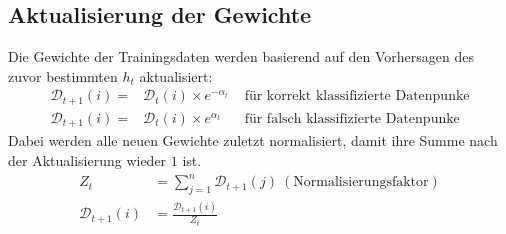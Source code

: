 \documentclass[11pt,a4paper,oneside]{scrartcl}
\begin{document}
\subsection*{Aktualisierung der Gewichte}
Die Gewichte der Trainingsdaten werden basierend auf den Vorhersagen des zuvor bestimmten $h_t$ aktualisiert:
\begin{align*}
    \mathcal{D}_{t+1}(i) = & \mathcal{D}_{t}(i) \times e^{-\alpha_t} & \text{ für korrekt klassifizierte Datenpunke} \\
    \mathcal{D}_{t+1}(i) = & \mathcal{D}_{t}(i) \times e^{\alpha_t}  & \text{ für falsch klassifizierte Datenpunke}
\end{align*}
Dabei werden alle neuen Gewichte zuletzt normalisiert, damit ihre Summe nach der Aktualisierung wieder $1$ ist.
\begin{align*}
    Z_t                  & =\sum_{j=1}^n\mathcal{D}_{t+1}(j)~(\text{Normalisierungsfaktor}) \\
    \mathcal{D}_{t+1}(i) & = \frac{\mathcal{D}_{t+1}(i)}{Z_t}
\end{align*}
\end{document}
